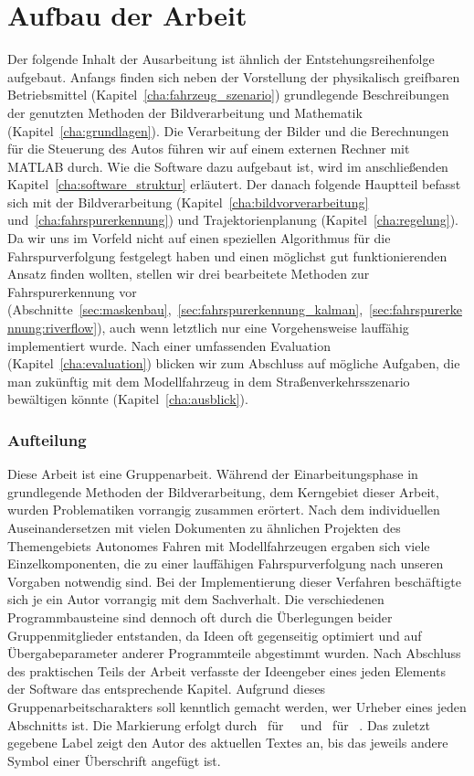 \section{Aufbau der Arbeit \dcfirstauthorshort}

Der folgende Inhalt der Ausarbeitung ist ähnlich der Entstehungsreihenfolge aufgebaut. Anfangs finden sich neben der Vorstellung der physikalisch greifbaren Betriebsmittel (Kapitel~\ref{cha:fahrzeug_szenario}) grundlegende Beschreibungen der genutzten Methoden der Bildverarbeitung und Mathematik (Kapitel~\ref{cha:grundlagen}). Die Verarbeitung der Bilder und die Berechnungen für die Steuerung des Autos führen wir auf einem externen Rechner mit MATLAB durch. Wie die Software dazu aufgebaut ist, wird im anschließenden Kapitel~\ref{cha:software_struktur} erläutert. Der danach folgende Hauptteil befasst sich mit der Bildverarbeitung (Kapitel~\ref{cha:bildvorverarbeitung} und~\ref{cha:fahrspurerkennung}) und Trajektorienplanung (Kapitel~\ref{cha:regelung}). Da wir uns im Vorfeld nicht auf einen speziellen Algorithmus für die Fahrspurverfolgung festgelegt haben und einen möglichst gut funktionierenden Ansatz finden wollten, stellen wir drei bearbeitete Methoden zur Fahrspurerkennung vor (Abschnitte~\ref{sec:maskenbau},~\ref{sec:fahrspurerkennung_kalman},~\ref{sec:fahrspurerkennung:riverflow}), auch wenn letztlich nur eine Vorgehensweise lauffähig implementiert wurde. Nach einer umfassenden Evaluation (Kapitel~\ref{cha:evaluation}) blicken wir zum Abschluss auf mögliche Aufgaben, die man zukünftig mit dem Modellfahrzeug in dem Straßenverkehrsszenario bewältigen könnte (Kapitel~\ref{cha:ausblick}).

\subsubsection{Aufteilung \dcsecondauthorshort}

Diese Arbeit ist eine Gruppenarbeit.
Während der Einarbeitungsphase in grundlegende Methoden der Bildverarbeitung, dem Kerngebiet dieser Arbeit, wurden Problematiken vorrangig zusammen erörtert. Nach dem individuellen Auseinandersetzen mit vielen Dokumenten zu ähnlichen Projekten des Themengebiets \glqq Autonomes Fahren mit Modellfahrzeugen\grqq{} ergaben sich viele Einzelkomponenten, die zu einer lauffähigen Fahrspurverfolgung nach unseren Vorgaben notwendig sind. Bei der Implementierung dieser Verfahren beschäftigte sich je ein Autor vorrangig mit dem Sachverhalt. Die verschiedenen Programmbausteine sind dennoch oft durch die Überlegungen beider Gruppenmitglieder entstanden, da Ideen oft gegenseitig optimiert und auf Übergabeparameter anderer Programmteile abgestimmt wurden. Nach Abschluss des praktischen Teils der Arbeit verfasste der Ideengeber eines jeden Elements der Software das entsprechende Kapitel.   
Aufgrund dieses Gruppenarbeitscharakters soll kenntlich gemacht werden, wer Urheber eines jeden Abschnitts ist. Die Markierung erfolgt durch \dcfirstauthorshort\ für \dcfirstauthorfirstname\ \dcfirstauthorlastname\  und \dcsecondauthorshort\  für \dcsecondauthorfirstname\ \dcsecondauthorlastname{}. Das zuletzt gegebene Label zeigt den Autor des aktuellen Textes an, bis das jeweils andere Symbol einer Überschrift angefügt ist.


